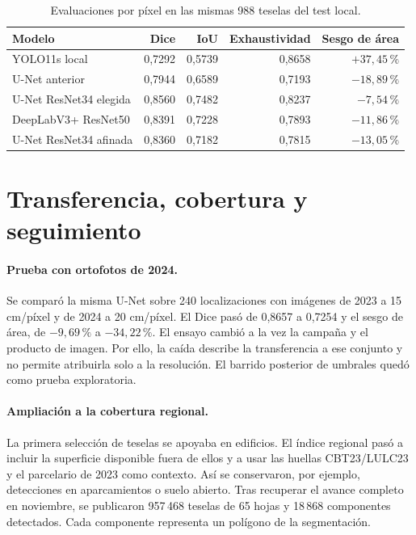 \documentclass[11pt,a4paper]{article}
\begin{document}
\begin{table}[htbp]
\centering
\caption{Evaluaciones por píxel en las mismas 988 teselas del test local.}
\label{tab:modelos}
\begin{tabular}{lrrrr}
\toprule
Modelo & Dice & IoU & Exhaustividad & Sesgo de área \\
\midrule
YOLO11s local & 0,7292 & 0,5739 & 0,8658 & \(+37{,}45\,\%\) \\
U-Net anterior & 0,7944 & 0,6589 & 0,7193 & \(-18{,}89\,\%\) \\
U-Net ResNet34 elegida & 0,8560 & 0,7482 & 0,8237 & \(-7{,}54\,\%\) \\
DeepLabV3+ ResNet50 & 0,8391 & 0,7228 & 0,7893 & \(-11{,}86\,\%\) \\
U-Net ResNet34 afinada & 0,8360 & 0,7182 & 0,7815 & \(-13{,}05\,\%\) \\
\bottomrule
\end{tabular}
\end{table}

\section{Transferencia, cobertura y seguimiento}

\paragraph{Prueba con ortofotos de 2024.}
Se comparó la misma U-Net sobre 240 localizaciones con imágenes de 2023 a 15 cm/píxel y de 2024 a 20 cm/píxel. El Dice pasó de 0,8657 a 0,7254 y el sesgo de área, de \(-9{,}69\,\%\) a \(-34{,}22\,\%\). El ensayo cambió a la vez la campaña y el producto de imagen. Por ello, la caída describe la transferencia a ese conjunto y no permite atribuirla solo a la resolución. El barrido posterior de umbrales quedó como prueba exploratoria.

\paragraph{Ampliación a la cobertura regional.}
La primera selección de teselas se apoyaba en edificios. El índice regional pasó a incluir la superficie disponible fuera de ellos y a usar las huellas CBT23/LULC23 y el parcelario de 2023 como contexto. Así se conservaron, por ejemplo, detecciones en aparcamientos o suelo abierto. Tras recuperar el avance completo en noviembre, se publicaron 957\,468 teselas de 65 hojas y 18\,868 componentes detectados. Cada componente representa un polígono de la segmentación.
\end{document}
